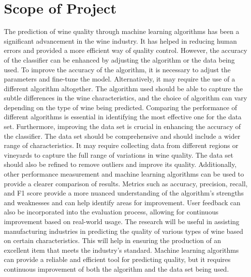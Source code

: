 \documentclass[a4paper, 12pt]{report}
\begin{document}
\section{Scope of Project}
\par The prediction of wine quality through machine learning algorithms has been a significant advancement in the wine industry. It has helped in reducing human errors and provided a more efficient way of quality control. However, the accuracy of the classifier can be enhanced by adjusting the algorithm or the data being used. To improve the accuracy of the algorithm, it is necessary to adjust the parameters and fine-tune the model. Alternatively, it may require the use of a different algorithm altogether. The algorithm used should be able to capture the subtle differences in the wine characteristics, and the choice of algorithm can vary depending on the type of wine being predicted. Comparing the performance of different algorithms is essential in identifying the most effective one for the data set. Furthermore, improving the data set is crucial in enhancing the accuracy of the classifier. The data set should be comprehensive and should include a wider range of characteristics. It may require collecting data from different regions or vineyards to capture the full range of variations in wine quality. The data set should also be refined to remove outliers and improve its quality. Additionally, other performance measurement and machine learning algorithms can be used to provide a clearer comparison of results. Metrics such as accuracy, precision, recall, and F1 score provide a more nuanced understanding of the algorithm's strengths and weaknesses and can help identify areas for improvement. User feedback can also be incorporated into the evaluation process, allowing for continuous improvement based on real-world usage. The research will be useful in assisting manufacturing industries in predicting the quality of various types of wine based on certain characteristics. This will help in ensuring the production of an excellent item that meets the industry's standard. Machine learning algorithms can provide a reliable and efficient tool for predicting quality, but it requires continuous improvement of both the algorithm and the data set being used.
\end{document}
